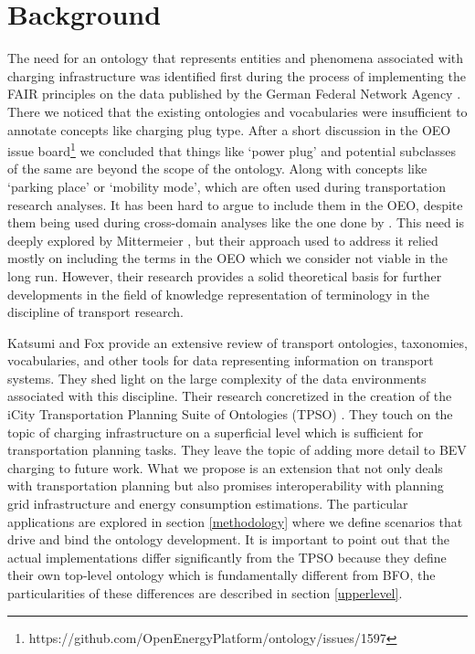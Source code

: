 ﻿\section{Background}
\label{statementofneed}
The need for an ontology that represents entities and phenomena associated with
charging infrastructure was identified first during the process of implementing
the FAIR principles on the data published by the German Federal Network Agency
\cite{ArellanoRuiz.2024}. There we noticed that the existing ontologies and
vocabularies were insufficient to annotate concepts like charging plug type.
After a short discussion in the OEO issue
board\footnote{https://github.com/OpenEnergyPlatform/ontology/issues/1597} we
concluded that things like `power plug' and potential subclasses of the same are
beyond the scope of the ontology. Along with concepts like `parking place' or
`mobility mode', which are often used during transportation research analyses.
It has been hard to argue to include them in the OEO, despite them being used
during cross-domain analyses like the one done by \cite{Hecht.2022}. This need
is deeply explored by Mittermeier \cite{Mittermeier.2023}, but their approach
used to address it relied mostly on including the terms in the OEO which we
consider not viable in the long run. However, their research provides a solid
theoretical basis for further developments in the field of knowledge
representation of terminology in the discipline of transport research.

Katsumi and Fox \cite{Katsumi.2018} provide an extensive review of transport
ontologies, taxonomies, vocabularies, and other tools for data representing
information on transport systems. They shed light on the large complexity of
the data environments associated with this discipline. Their research concretized
in the creation of the iCity Transportation Planning Suite of Ontologies (TPSO)
\cite{Katsumi.2019}. They touch on the topic of charging infrastructure on a
superficial level which is sufficient for transportation planning tasks. They
leave the topic of adding more detail to BEV charging to future work. What we
propose is an extension that not only deals with transportation planning but
also promises interoperability with planning grid infrastructure and energy
consumption estimations. The particular applications are explored in section
\ref{methodology} where we define scenarios that drive and bind the ontology
development. It is important to point out that the actual implementations
differ significantly from the TPSO because they define their own top-level
ontology which is fundamentally different from BFO, the particularities of
these differences are described in section \ref{upperlevel}.

